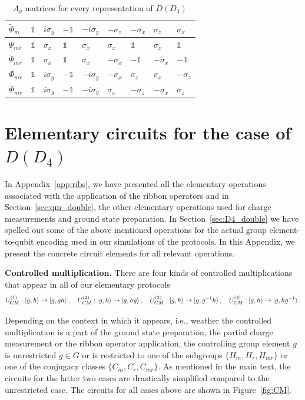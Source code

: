 \documentclass[a4paper,twocolumn,11pt, accepted=2024-06-14]{quantumarticle}
\begin{document}
\begin{table}[]
\begin{tabular}{|l||l|l|l|l|l|l|l|l|}
 $\tilde{\Phi}_{m}$ &$\mathbb{1}$&$i\sigma_y$ &$-\mathbb{1}$& $-i\sigma_y$ &$-\sigma_z$ &$-\sigma_x$ &  $\sigma_z$ &   $\sigma_x$ \\\hline
$\Psi_{mr}$ &$\mathbb{1}$&  $\sigma_x$ & $\mathbb{1}$&  $\sigma_x$ & $\sigma_x$ & $\mathbb{1}$&  $\sigma_x$ &   $\mathbb{1}$\\\hline
$\tilde{\Psi}_{mr}$ &$\mathbb{1}$&  $\sigma_x$ & $\mathbb{1}$&  $\sigma_x$ &$-\sigma_x$ &$-\mathbb{1}$& $-\sigma_x$ &  $-\mathbb{1}$\\\hline
$\Phi_{mr}$ &$\mathbb{1}$&$i\sigma_y$ &$-\mathbb{1}$& $-i\sigma_y$ &$-\sigma_x$ & $\sigma_z$ &  $\sigma_x$ &  $-\sigma_z$ \\\hline
$\tilde{\Phi}_{mr}$ &$\mathbb{1}$&$i\sigma_y$ &$-\mathbb{1}$& $-i\sigma_y$ & $\sigma_x$ &$-\sigma_z$ & $-\sigma_x$ &   $\sigma_z$ \\\hline
\end{tabular}
    \caption{$A_g$ matrices for every representation of $D(D_4)$}
    \label{tab:reps}
\end{table}




\section{Elementary circuits for the case of $D(D_4)$}\label{app:cirqs}

In Appendix~\ref{app:ribs}, we have presented all the elementary operations associated with the application of the ribbon operators and in Section~\ref{sec:qm_double}, the other elementary operations used for charge measurements and ground state preparation.
In Section~\ref{sec:D4_double} we have spelled out some of the above mentioned operations for the actual group element-to-qubit encoding used in our simulations of the protocols. In this Appendix, we present the concrete circuit elements for all relevant operations.

\textbf{Controlled multiplication.} 
There are four kinds of controlled multiplications that appear in all of our elementary protocols
\begin{equation}\label{eq:circs}
U_{CM}^{(1)}: \ket{g,h} \rightarrow \ket{g, gh}, \quad
U_{CM}^{(2)}: \ket{g,h} \rightarrow \ket{g, hg}, \quad
U_{CM}^{(3)}: \ket{g,h} \rightarrow \ket{g, g^{-1}h}, \quad
U_{CM}^{(4)}: \ket{g,h} \rightarrow \ket{g, hg^{-1}}.	
\end{equation}

Depending on the context in which it appears, i.e., weather the controlled multiplication is a part of the ground state preparation, the partial charge measurement or  the ribbon operator application, the controlling group element $g$ is unrestricted $g \in G$ or is restricted to one of the subgroups $\{H_m, H_r, H_{mr}\}$ or one of the conjugacy classes $\{C_m, C_r, C_{mr}\}$. As mentioned in the main text, the circuits for the latter two cases are drastically simplified compared to the unrestricted case. The circuits for all cases above are shown in Figure~\ref{fig:CM}.
\end{document}
